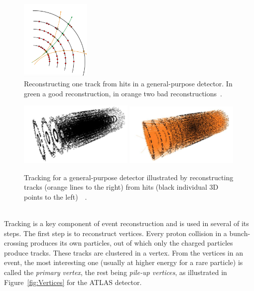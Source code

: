 \begin{figure}[!htb]
\centering
\includegraphics[width=0.30\textwidth]{./plots/TrackReconstruction.png}
\caption{Reconstructing one track from hits in a general-purpose detector. In green a good reconstruction, in orange two bad reconstructions~\cite{TrackMLPPTBefore}.}
\label{fig:FromHitsToTracks}
\end{figure}

\begin{figure}[!htb]
\centering
\includegraphics[width=0.49\textwidth]{./plots/Hits.png}
\includegraphics[width=0.49\textwidth]{./plots/Tracks.png}
\caption{Tracking for a general-purpose detector illustrated by reconstructing tracks (orange lines to the right) from hits (black individual 3D points to the left)~\cite{TrackMLPPTAfter}~\cite{TrackMLPPTAfter2}.}
\label{fig:FromHitsToTracks2}
\end{figure}

\ \\Tracking is a key component of event reconstruction and is used in several of its steps. The first step is to reconstruct vertices. Every proton collision in a bunch-crossing produces its own particles, out of which only the charged particles produce tracks. These tracks are clustered in a vertex. From the vertices in an event, the most interesting one (usually at higher energy for a rare particle) is called the \emph{primary vertex}, the rest being \emph{pile-up vertices}, as illustrated in Figure~\ref{fig:Vertices} for the ATLAS detector. 


